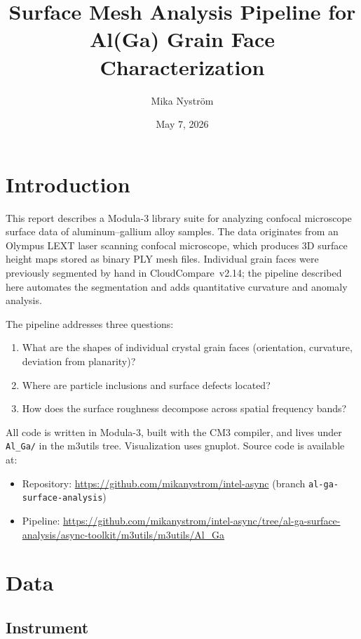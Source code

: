 \documentclass[11pt]{article}
\title{Surface Mesh Analysis Pipeline for\\Al(Ga) Grain Face Characterization}
\author{Mika Nystr\"om}
\date{May 7, 2026}
\begin{document}
\maketitle
\tableofcontents
\clearpage

\section{Introduction}

This report describes a Modula-3 library suite for analyzing
confocal microscope surface data of aluminum--gallium alloy samples.
The data originates from an Olympus LEXT laser scanning confocal
microscope, which produces 3D surface height maps stored as binary PLY
mesh files.  Individual grain faces were previously segmented by hand
in CloudCompare~v2.14; the pipeline described here automates the
segmentation and adds quantitative curvature and anomaly analysis.

The pipeline addresses three questions:
\begin{enumerate}
\item What are the shapes of individual crystal grain faces
  (orientation, curvature, deviation from planarity)?
\item Where are particle inclusions and surface defects located?
\item How does the surface roughness decompose across spatial
  frequency bands?
\end{enumerate}

All code is written in Modula-3, built with the CM3 compiler, and
lives under \texttt{Al\_Ga/} in the m3utils tree.  Visualization uses
gnuplot.  Source code is available at:
\begin{itemize}
\item Repository: \url{https://github.com/mikanystrom/intel-async} (branch \texttt{al-ga-surface-analysis})
\item Pipeline: \url{https://github.com/mikanystrom/intel-async/tree/al-ga-surface-analysis/async-toolkit/m3utils/m3utils/Al_Ga}
\end{itemize}

\section{Data}

\subsection{Instrument}
\end{document}
